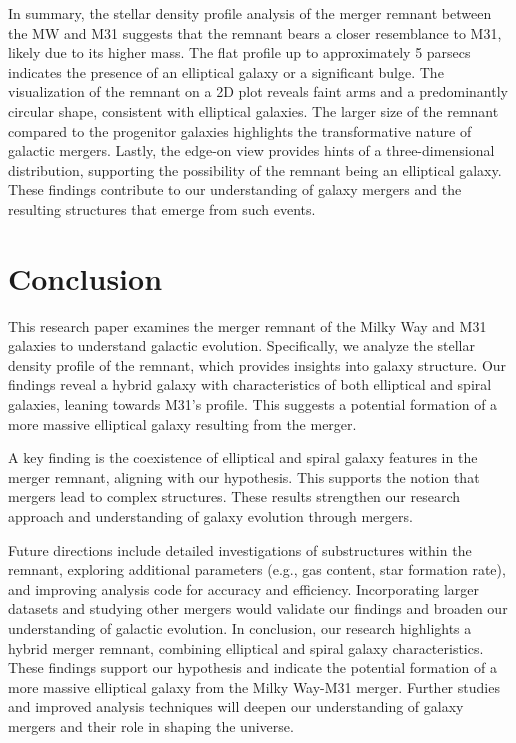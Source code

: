 \documentclass[preprint2, times]{aastex631}
\begin{document}
In summary, the stellar density profile analysis of the merger remnant between the MW and M31 suggests that the remnant bears a closer resemblance to M31, likely due to its higher mass. The flat profile up to approximately 5 parsecs indicates the presence of an elliptical galaxy or a significant bulge. The visualization of the remnant on a 2D plot reveals faint arms and a predominantly circular shape, consistent with elliptical galaxies. The larger size of the remnant compared to the progenitor galaxies highlights the transformative nature of galactic mergers. Lastly, the edge-on view provides hints of a three-dimensional distribution, supporting the possibility of the remnant being an elliptical galaxy. These findings contribute to our understanding of galaxy mergers and the resulting structures that emerge from such events.
\section{Conclusion}
This research paper examines the merger remnant of the Milky Way and M31 galaxies to understand galactic evolution. Specifically, we analyze the stellar density profile of the remnant, which provides insights into galaxy structure. Our findings reveal a hybrid galaxy with characteristics of both elliptical and spiral galaxies, leaning towards M31's profile. This suggests a potential formation of a more massive elliptical galaxy resulting from the merger.
\par
A key finding is the coexistence of elliptical and spiral galaxy features in the merger remnant, aligning with our hypothesis. This supports the notion that mergers lead to complex structures. These results strengthen our research approach and understanding of galaxy evolution through mergers.
\par
Future directions include detailed investigations of substructures within the remnant, exploring additional parameters (e.g., gas content, star formation rate), and improving analysis code for accuracy and efficiency. Incorporating larger datasets and studying other mergers would validate our findings and broaden our understanding of galactic evolution.
In conclusion, our research highlights a hybrid merger remnant, combining elliptical and spiral galaxy characteristics. These findings support our hypothesis and indicate the potential formation of a more massive elliptical galaxy from the Milky Way-M31 merger. Further studies and improved analysis techniques will deepen our understanding of galaxy mergers and their role in shaping the universe.
\end{document}

